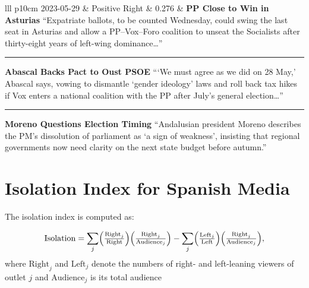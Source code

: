 \documentclass[12pt]{article}
\begin{document}
\begin{center}
\begin{longtable}{lll p{10cm}}
			2023-05-29 & Positive Right & 0.276 &
			\textbf{PP Close to Win in Asturias}\newline
			{\scriptsize“Expatriate ballots, to be counted Wednesday, could swing the last seat in Asturias and allow a PP–Vox–Foro coalition to unseat the Socialists after thirty-eight years of left-wing dominance…”}\par\noindent\rule{\linewidth}{0.4pt}\par
			\textbf{Abascal Backs Pact to Oust PSOE}\newline
			{\scriptsize“‘We must agree as we did on 28 May,’ Abascal says, vowing to dismantle ‘gender ideology’ laws and roll back tax hikes if Vox enters a national coalition with the PP after July’s general election…”}\par\noindent\rule{\linewidth}{0.4pt}\par
			\textbf{Moreno Questions Election Timing}\newline
			{\scriptsize“Andalusian president Moreno describes the PM’s dissolution of parliament as ‘a sign of weakness’, insisting that regional governments now need clarity on the next state budget before autumn.”} \\
			\hline
				\caption*{The table shows days with highest increase in news production between midday and night editions for each content type together with the stories of that type that appeared on Agencia EFE between the two editions.}
			\label{tab:within}
		\end{longtable}
	\end{center}
	
	
	
	
	






\section{Isolation Index for Spanish Media}
\label{sec:isolation}


The isolation index is computed as:


\[
\mathrm{Isolation}=%
\sum_{j}
\Bigl(\tfrac{\mathrm{Right}_j}{\mathrm{Right}}\Bigr)
\Bigl(\tfrac{\mathrm{Right}_j}{\mathrm{Audience}_j}\Bigr)
-
\sum_{j}
\Bigl(\tfrac{\mathrm{Left}_j}{\mathrm{Left}}\Bigr)
\Bigl(\tfrac{\mathrm{Right}_j}{\mathrm{Audience}_j}\Bigr),
\]
%
where $\mathrm{Right}_j$ and $\mathrm{Left}_j$ denote the numbers of right- and left-leaning viewers of outlet $j$ and $\text{Audience}_j$ is its total audience
\end{document}
